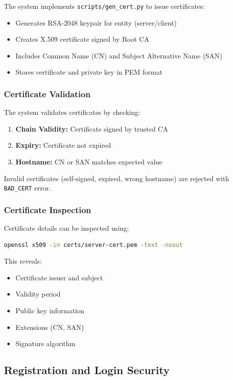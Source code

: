 \documentclass[runningheads]{llncs}
\begin{document}
The system implements \texttt{scripts/gen\_cert.py} to issue certificates:
\begin{itemize}
    \item Generates RSA-2048 keypair for entity (server/client)
    \item Creates X.509 certificate signed by Root CA
    \item Includes Common Name (CN) and Subject Alternative Name (SAN)
    \item Stores certificate and private key in PEM format
\end{itemize}

\subsubsection{Certificate Validation}

The system validates certificates by checking:
\begin{enumerate}
    \item \textbf{Chain Validity:} Certificate signed by trusted CA
    \item \textbf{Expiry:} Certificate not expired
    \item \textbf{Hostname:} CN or SAN matches expected value
\end{enumerate}

Invalid certificates (self-signed, expired, wrong hostname) are rejected with \texttt{BAD\_CERT} error.

\subsubsection{Certificate Inspection}

Certificate details can be inspected using:
\begin{lstlisting}[language=bash]
openssl x509 -in certs/server-cert.pem -text -noout
\end{lstlisting}

This reveals:
\begin{itemize}
    \item Certificate issuer and subject
    \item Validity period
    \item Public key information
    \item Extensions (CN, SAN)
    \item Signature algorithm
\end{itemize}

\subsection{Registration and Login Security}
\end{document}
